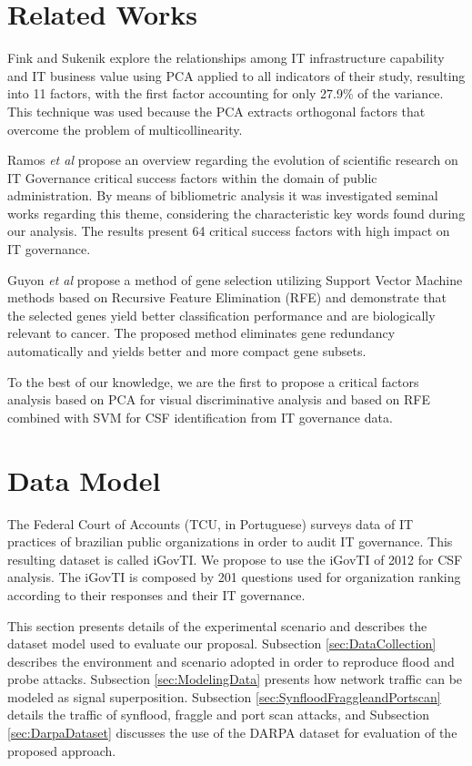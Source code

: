 \section{Related Works}
\label{sec:relatedworks}

Fink and Sukenik \cite{fink2011effect} explore the relationships among IT infrastructure capability and IT business value using PCA applied to all indicators of their study, resulting into 11 factors, with the first factor accounting for only 27.9\% of the variance. This technique was used because the PCA extracts orthogonal factors that overcome the problem of multicollinearity.

Ramos \emph{et al} \cite{ramos2016information} propose an overview regarding the evolution of scientific research on IT Governance critical success factors within the domain of public administration. By means of bibliometric analysis it was investigated seminal works regarding this theme, considering the characteristic key words found during our analysis. The results present 64 critical success factors with high impact on IT governance.

Guyon \emph{et al} \cite{guyon2002gene} propose a method of gene selection utilizing Support Vector Machine methods based on Recursive Feature Elimination (RFE) and demonstrate that the selected genes yield better classification performance and are biologically relevant to cancer.  The proposed method eliminates gene redundancy automatically and yields better and more compact gene subsets. 

To the best of our knowledge, we are the first to propose a critical factors analysis based on PCA for visual discriminative analysis and based on RFE combined with SVM for CSF identification from IT governance data.

\section{Data Model}
\label{sec:datamodel}

The Federal Court of Accounts (TCU, in Portuguese) surveys data of IT practices of brazilian public organizations in order to audit IT governance. This resulting dataset is called iGovTI. We propose to use the iGovTI of 2012 for CSF analysis. The iGovTI is composed by 201 questions used for organization ranking according to their responses and their IT governance.

This section presents details of the experimental scenario and describes the dataset model used to evaluate our proposal. Subsection \ref{sec:DataCollection} describes the environment and scenario adopted in order to reproduce flood and probe attacks. Subsection \ref{sec:ModelingData} presents how network traffic can be modeled as signal superposition. Subsection \ref{sec:SynfloodFraggleandPortscan} details the traffic of synflood, fraggle and port scan attacks, and Subsection \ref{sec:DarpaDataset} discusses the use of the DARPA dataset for evaluation of the proposed approach.

